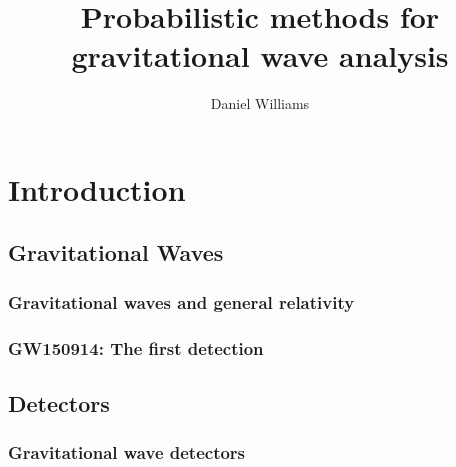 \documentclass{kentigern}
\title{Probabilistic methods for gravitational wave analysis}
\author{Daniel Williams}
\theoremstyle{definition}
\begin{document}

\begin{titlepage}
\thispagestyle{empty}

\maketitle
\newpage
\end{titlepage}


\tableofcontents

\dominitoc
\newpage



\part{Introduction}
\label{part:intro}


 \chapter{Gravitational Waves}
 \label{cha:grav-waves}
 
 \chapterprecis{}
 \minitoc

 \section{Gravitational waves and general relativity}
 \label{sec:grav-waves-gener}
 

 \section{GW150914: The first detection}
 \label{sec:gw150914:-first-dete}
 


 \chapter{Detectors}
 \label{cha:detectors}
 \chapterprecis{}

 \section{Gravitational wave detectors}
 \label{sec:detectors}
\end{document}

